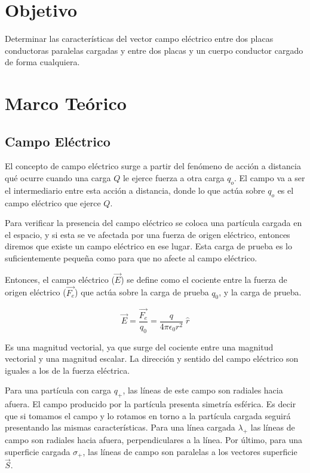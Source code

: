 \documentclass{article}
\begin{document}
\section{Objetivo}

Determinar las características del vector campo eléctrico entre dos placas conductoras paralelas cargadas y entre dos placas y un cuerpo conductor cargado de forma cualquiera.

\section{Marco Teórico}

\subsection{Campo Eléctrico}

El concepto de campo eléctrico surge a partir del fenómeno de acción a distancia qué ocurre cuando una carga $Q$ le ejerce fuerza a otra carga $q_o$. El campo va a ser el intermediario entre esta acción a distancia, donde lo que actúa sobre $q_o$ es el campo eléctrico que ejerce $Q$.

Para verificar la presencia del campo eléctrico se coloca una partícula cargada en el espacio, y si esta se ve afectada por una fuerza de origen eléctrico, entonces diremos que existe un campo eléctrico en ese lugar. Esta carga de prueba es lo suficientemente pequeña como para que no afecte al campo eléctrico.

Entonces, el campo eléctrico ($\vec{E}$) se define como el cociente  entre la fuerza de origen eléctrico ($\vec{F_e}$) que actúa sobre la carga de prueba $q_0$, y la carga de prueba.

\begin{equation*}
  \vec{E} = \frac{\vec{F_e}}{q_0} = \frac{q}{4 \pi \epsilon_0 r^2} \; \hat{r}
\end{equation*}

Es una magnitud vectorial, ya que surge del cociente entre una magnitud vectorial y una magnitud escalar. La dirección y sentido del campo eléctrico son iguales a los de la fuerza eléctrica.

Para una partícula con carga $q_+$, las líneas de este campo son radiales hacia afuera. El campo producido por la partícula presenta simetría esférica. Es decir que si tomamos el campo y lo rotamos en torno a la partícula cargada seguirá presentando las mismas características. Para una línea cargada $\lambda_+$ las líneas de campo son radiales hacia afuera, perpendiculares a la línea. Por último, para una superficie cargada $\sigma_+$, las líneas de campo son paralelas a los vectores superficie $\vec{S}$.
\end{document}
